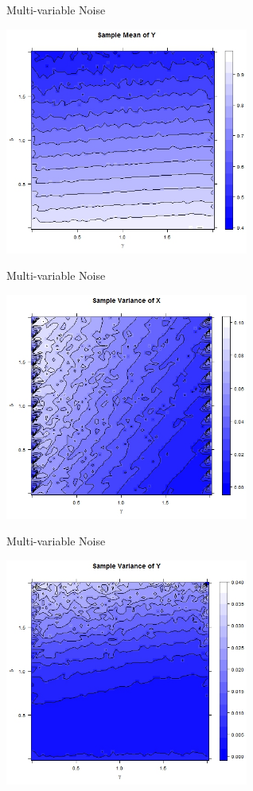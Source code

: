 \begin{frame}{Multi-variable Noise}
\begin{center}
	\includegraphics[width=8cm]{img/RplotMultiContourY} 
\end{center}
\end{frame}

\begin{frame}{Multi-variable Noise}
\begin{center}
	\includegraphics[width=8cm]{img/RplotSampleMultiVarX} 
\end{center}
\end{frame}

\begin{frame}{Multi-variable Noise}
\begin{center}
	\includegraphics[width=8cm]{img/RplotMultiSampleVarY} 
\end{center}
\end{frame}

